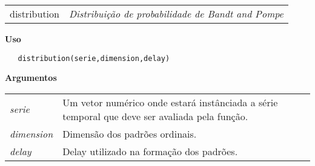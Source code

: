 \documentclass[12pt,letterpaper]{article}
\begin{document}

\hrulefill   

\begin{table}[!h]
\begin{center}
\begin{tabularx}{\textwidth}{X X}
\hspace{0.5cm} distribution & \textit{Distribuição de probabilidade de Bandt and Pompe}\\
\end{tabularx}
\end{center}
\end{table} 

\vspace{-0.5cm}

\hrulefill  

\vspace{0.5cm}

\textbf{Uso}

\begin{lstlisting}
   distribution(serie,dimension,delay)
\end{lstlisting}

\vspace{0.5cm}

\textbf{Argumentos}

\begin{table}[!h]
\begin{center}
\begin{tabularx}{\textwidth}{X X}
\hspace{0.5cm} \textit{serie} \vspace{0.5cm}& Um vetor numérico onde estará instânciada a série temporal que deve ser avaliada pela função.\vspace{0.5cm}\\
\hspace{0.5cm} \textit{dimension} \vspace{0.5cm}& Dimensão dos padrões ordinais.\vspace{0.5cm}\\
\hspace{0.5cm} \textit{delay} & Delay utilizado na formação dos padrões.\\
\end{tabularx}
\end{center}
\end{table} 

\newpage

\end{document}
